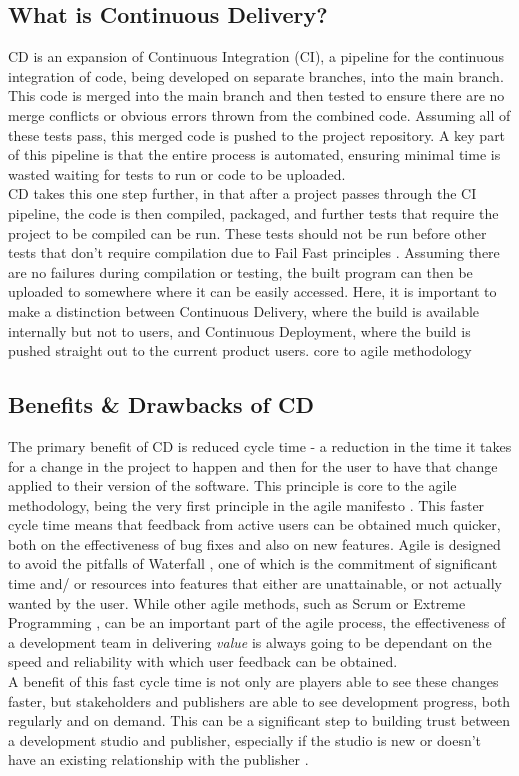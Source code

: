\documentclass[lettersize,journal]{IEEEtran}
\begin{document}
    \subsection{What is Continuous Delivery?}
        CD is an expansion of Continuous Integration (CI), a pipeline for the continuous integration of code, being developed on separate branches, into the main branch. This code is merged into the main branch and then tested to ensure there are no merge conflicts or obvious errors thrown from the combined code. Assuming all of these tests pass, this merged code is pushed to the project repository. A key part of this pipeline is that the entire process is automated, ensuring minimal time is wasted waiting for tests to run or code to be uploaded. \cite{ContDelIntro,CICDCD} \\
        CD takes this one step further, in that after a project passes through the CI pipeline, the code is then compiled, packaged, and further tests that require the project to be compiled can be run. These tests should not be run before other tests that don't require compilation due to Fail Fast principles \cite{shore2004fail,bamboo}. Assuming there are no failures during compilation or testing, the built program can then be uploaded to somewhere where it can be easily accessed. Here, it is important to make a distinction between Continuous Delivery, where the build is available internally but not to users, and Continuous Deployment, where the build is pushed straight out to the current product users.
        core to agile methodology \cite{agilemanifesto}

    \subsection{Benefits \& Drawbacks of CD}
        The primary benefit of CD is reduced cycle time - a reduction in the time it takes for a change in the project to happen and then for the user to have that change applied to their version of the software. This principle is core to the agile methodology, being the very first principle in the agile manifesto \cite{agilemanifesto}. This faster cycle time means that feedback from active users can be obtained much quicker, both on the effectiveness of bug fixes and also on new features. Agile is designed to avoid the pitfalls of Waterfall \cite{royce1987managing}, one of which is the commitment of significant time and/ or resources into features that either are unattainable, or not actually wanted by the user. While other agile methods, such as Scrum or Extreme Programming \cite{cohen2004introduction,agilewithscrum}, can be an important part of the agile process, the effectiveness of a development team in delivering \textit{value} is always going to be dependant on the speed and reliability with which user feedback can be obtained. \\
        A benefit of this fast cycle time is not only are players able to see these changes faster, but stakeholders and publishers are able to see development progress, both regularly and on demand. This can be a significant step to building trust between a development studio and publisher, especially if the studio is new or doesn't have an existing relationship with the publisher \cite{gamedevhandbook}. 
\end{document}
